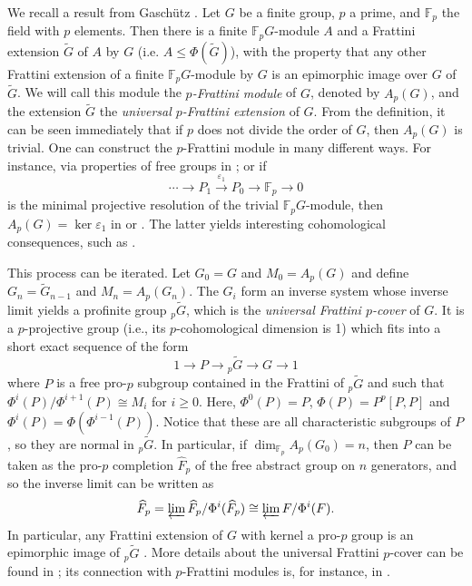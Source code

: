 \documentclass[a4paper,10pt]{amsart}
\theoremstyle{plain}
\theoremstyle{definition}
\begin{document}
We recall a result from Gasch\"{u}tz \cite{ga54}. Let $G$ be a finite group, $p$ a prime, and $\mathbb{F}_p$ the field with $p$ elements. Then there is a finite $\mathbb{F}_pG$-module $A$ and a Frattini extension $\widetilde{G}$ of $A$ by $G$ (i.e. $A\leq \Phi(\widetilde{G})$), with the property that any other Frattini extension of a finite $\mathbb{F}_pG$-module by $G$ is an epimorphic image over $G$ of $\widetilde{G}$. We will call this module the \emph{$p$-Frattini module} of $G$, denoted by $A_p(G)$, and the extension $\widetilde G$ the \emph{universal $p$-Frattini extension} of $G$. From the definition, it can be seen immediately that if $p$ does not divide the order of $G$, then $A_p(G)$ is trivial. One can construct the $p$-Frattini module in many different ways. For instance, via properties of free groups in \cite[Theorem 11.8]{DH}; or if
\[\cdots \rightarrow P_1 \xrightarrow{\varepsilon_1} P_0 \rightarrow \mathbb F_p \rightarrow 0 \]
is the minimal projective resolution of the trivial $\mathbb F_pG$-module, then $A_p(G) = \ker \varepsilon_1$ in \cite{ga54} or \cite[Theorem $\beta$.7]{DH}. The latter yields interesting cohomological consequences, such as \cite[Lemma 3]{GS78}.

This process can be iterated. Let $G_0=G$ and $M_0 = A_p(G)$ and define $G_n = \widetilde{G}_{n-1}$ and $M_n = A_p(G_n)$. The $G_i$ form an inverse system whose inverse limit yields a profinite group ${}_p \widetilde{G}$, which is the \emph{universal Frattini $p$-cover} of $G$. It is a $p$-projective group (i.e., its $p$-cohomological dimension is 1) which fits into a short exact sequence of the form
\[1 \xrightarrow{} P \to {}_p \widetilde G \rightarrow G \rightarrow 1\]
\sloppy where $P$ is a free pro-$p$ subgroup contained in the Frattini of ${}_p\widetilde G$ and such that $\Phi^i(P)/\Phi^{i+1}(P) \cong M_i$ for $i\geq 0$. Here, $\Phi^0(P) = P$, $\Phi(P) = P^p[P,P]$ and $\Phi^i(P) = \Phi(\Phi^{i-1}(P))$. Notice that these are all characteristic subgroups of $P$, so they are normal in ${}_p\widetilde G$. In particular, if $\dim_{\mathbb F_p} A_p(G_0) = n$, then $P$ can be taken as the pro-$p$ completion $\widehat {F}_p$ of the free abstract group on $n$ generators, and so the inverse limit can be written as
\[\widehat F_p = \varprojlim \widehat F_p/\Phi^i(\widehat F_p) \cong \varprojlim F/\Phi^i(F).\]
In particular, any Frattini extension of $G$ with kernel a pro-$p$ group is an epimorphic image of ${}_p \widetilde G$ \cite[Proposition 25.7.1, Corollary 25.12.2]{FJ}. More details about the universal Frattini $p$-cover can be found in \cite[Section 25.12]{FJ}; its connection with $p$-Frattini modules is, for instance, in \cite[$\S$3]{semmen}.
\end{document}
